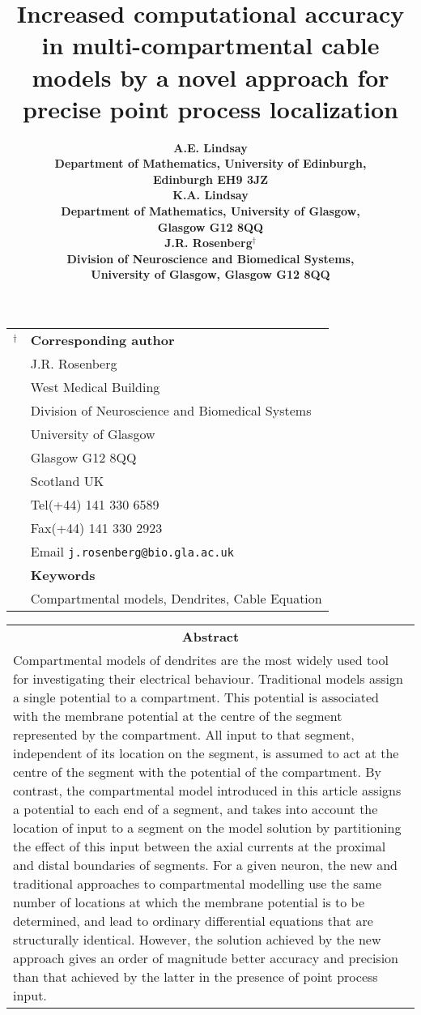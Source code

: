 \documentclass[11pt]{article}
\title{\LARGE\bf Increased computational accuracy in
multi-compartmental cable models by a novel approach for precise
point process localization}
\author{\Large\bf A.E. Lindsay\\
Department of Mathematics, University of Edinburgh,\\
Edinburgh EH9 3JZ \\[10pt]
\Large\bf K.A. Lindsay \\
Department of Mathematics, University of Glasgow,\\
Glasgow G12 8QQ \\[10pt]
\Large\bf J.R. Rosenberg$^\dagger$\\
Division of Neuroscience and Biomedical Systems,\\
University of Glasgow, Glasgow G12 8QQ}
\begin{document}

\maketitle

\thispagestyle{empty}

\vfil

\begin{tabular}{ll}
$^\dagger$  & \textbf{Corresponding author} \\[5pt]
            & J.R. Rosenberg \\
            & West Medical Building \\
            & Division of Neuroscience and Biomedical Systems \\
            & University of Glasgow \\
            & Glasgow G12 8QQ \\
            & Scotland UK \\[5pt]
            & Tel\quad(+44) 141 330 6589 \\
            & Fax\quad(+44) 141 330 2923 \\
            & Email \verb$j.rosenberg@bio.gla.ac.uk$\\[10pt]
            & \textbf{Keywords} \\[5pt]
            & Compartmental models, Dendrites, Cable Equation
\end{tabular}

\vfil

\pagebreak[4]

\begin{center}
\begin{tabular}{p{5.2in}}
\multicolumn{1}{c}{\textbf{Abstract}}\\[10pt]

Compartmental models of dendrites are the most widely used tool
for investigating their electrical behaviour. Traditional models
assign a single potential to a compartment. This potential is
associated with the membrane potential at the centre of the
segment represented by the compartment. All input to that segment,
independent of its location on the segment, is assumed to act at
the centre of the segment with the potential of the compartment.
By contrast, the compartmental model introduced in this article
assigns a potential to each end of a segment, and takes into
account the location of input to a segment on the model solution
by partitioning the effect of this input between the axial
currents at the proximal and distal boundaries of segments. For a
given neuron, the new and traditional approaches to compartmental
modelling use the same number of locations at which the membrane
potential is to be determined, and lead to ordinary differential
equations that are structurally identical. However, the solution
achieved by the new approach gives an order of magnitude better
accuracy and precision than that achieved by the latter in the
presence of point process input.
\end{tabular}
\end{center}

\pagebreak[4]








\closegraphsfile
\end{document}
